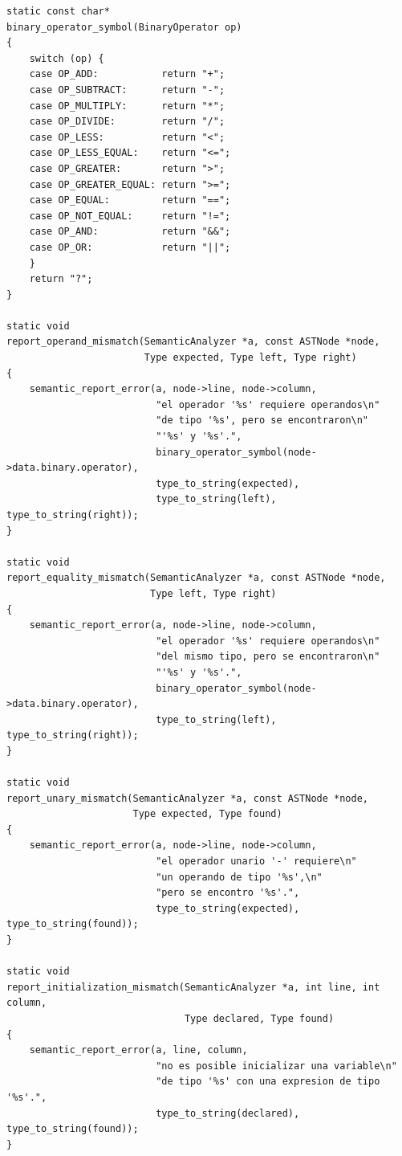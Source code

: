 \documentclass[12pt,letterpaper]{article}
\begin{document}
\begin{lstlisting}[style=modernc, caption={\texttt{type\_checker.c}: diagnósticos.}]
static const char*
binary_operator_symbol(BinaryOperator op)
{
    switch (op) {
    case OP_ADD:           return "+";
    case OP_SUBTRACT:      return "-";
    case OP_MULTIPLY:      return "*";
    case OP_DIVIDE:        return "/";
    case OP_LESS:          return "<";
    case OP_LESS_EQUAL:    return "<=";
    case OP_GREATER:       return ">";
    case OP_GREATER_EQUAL: return ">=";
    case OP_EQUAL:         return "==";
    case OP_NOT_EQUAL:     return "!=";
    case OP_AND:           return "&&";
    case OP_OR:            return "||";
    }
    return "?";
}

static void
report_operand_mismatch(SemanticAnalyzer *a, const ASTNode *node,
                        Type expected, Type left, Type right)
{
    semantic_report_error(a, node->line, node->column,
                          "el operador '%s' requiere operandos\n"
                          "de tipo '%s', pero se encontraron\n"
                          "'%s' y '%s'.",
                          binary_operator_symbol(node->data.binary.operator),
                          type_to_string(expected),
                          type_to_string(left), type_to_string(right));
}

static void
report_equality_mismatch(SemanticAnalyzer *a, const ASTNode *node,
                         Type left, Type right)
{
    semantic_report_error(a, node->line, node->column,
                          "el operador '%s' requiere operandos\n"
                          "del mismo tipo, pero se encontraron\n"
                          "'%s' y '%s'.",
                          binary_operator_symbol(node->data.binary.operator),
                          type_to_string(left), type_to_string(right));
}

static void
report_unary_mismatch(SemanticAnalyzer *a, const ASTNode *node,
                      Type expected, Type found)
{
    semantic_report_error(a, node->line, node->column,
                          "el operador unario '-' requiere\n"
                          "un operando de tipo '%s',\n"
                          "pero se encontro '%s'.",
                          type_to_string(expected), type_to_string(found));
}

static void
report_initialization_mismatch(SemanticAnalyzer *a, int line, int column,
                               Type declared, Type found)
{
    semantic_report_error(a, line, column,
                          "no es posible inicializar una variable\n"
                          "de tipo '%s' con una expresion de tipo '%s'.",
                          type_to_string(declared), type_to_string(found));
}


\end{lstlisting}
\end{document}
